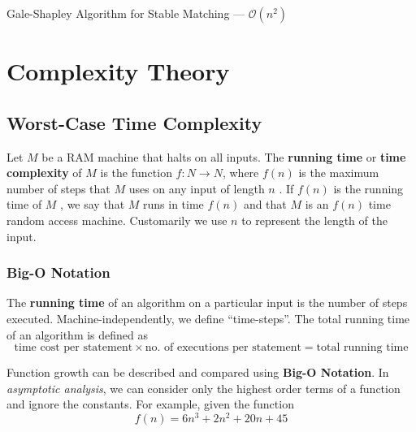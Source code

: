 \begin{algorithm}[H]
	\caption{Gale-Shapley Algorithm for Stable Matching --- \( \mathcal{O}(n^2) \) }\label{alg:gale}
	\begin{algorithmic}
		\Else{}
		\Else{}
		\EndIf{}
		\EndIf{}
		\EndWhile{}
		\EndFunction{}
	\end{algorithmic}
\end{algorithm}

\section{Complexity Theory}

\subsection{Worst-Case Time Complexity}

Let \( M \) be a RAM machine that halts on all inputs. The \textbf{running time} or \textbf{time complexity} of \( M \) is the function \( f: N \rightarrow N \), where \( f(n) \) is the maximum number of steps that \( M \) uses on any input of length \( n \) . If \( f(n) \) is the running time of \( M \) , we say that \( M \) runs in time \( f(n) \) and that \( M \) is an \( f(n) \) time random access machine. Customarily we use \( n \) to represent the length of the input.

\subsubsection{Big-O Notation}
The \textbf{running time} of an algorithm on a particular input is the number of steps executed. Machine-independently, we define ``time-steps''. The total running time of an algorithm is defined as
\[
	\textrm{time cost per statement} \times \textrm{no. of executions per statement} = \textrm{total running time}
\]

Function growth can be described and compared using \textbf{Big-O Notation}. In \emph{asymptotic analysis}, we can consider only the highest order terms of a function and ignore the constants. For example, given the function \[
f(n) = 6n^3 + 2n^2 + 20n +45	
\]  

